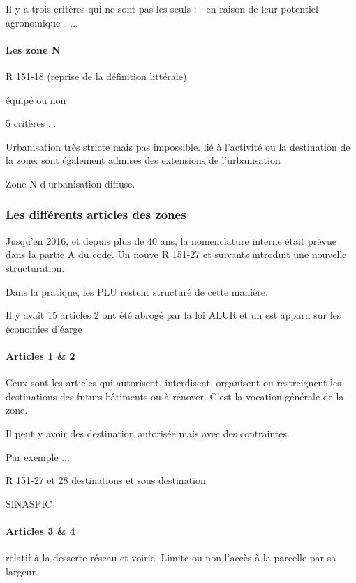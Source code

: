 			Il y a trois critères qui ne sont pas les seuls :
			- en raison de leur potentiel agronomique
			- ...
		
		\paragraph{Les zone N} R 151-18 (reprise de la définition littérale)
			
			équipé ou non
			
			5 critères ...
			
			Urbanisation très stricte mais pas impossible. lié à l'activité ou la destination de la zone. sont également admises des extensions de l'urbanisation
				
			Zone N d'urbanisation diffuse.
			
		\subsubsection{Les différents articles des zones}
		
			Jusqu'en 2016, et depuis plus de 40 ans, la nomenclature interne était prévue dans la partie A du code. Un nouve R 151-27 et suivants introduit une nouvelle structuration.
			
			Dans la pratique, les PLU restent structuré de cette manière.
			
			Il y avait 15 articles 2 ont été abrogé par la loi ALUR et un est apparu sur les économies d'éarge
			
			\paragraph{Articles 1 \& 2} Ceux sont les articles qui autorisent, interdisent, organisent ou restreignent les destinations des futurs bâtiments ou à rénover. C’est la vocation générale de la zone.
		
			Il peut y avoir des destination autorisée mais avec des contraintes.
			
			Par exemple ...
			
			R 151-27 et 28 destinations et sous destination 
			
			SINASPIC
			
			\paragraph{Articles 3 \& 4} relatif à la desserte réseau et voirie. Limite ou non l’accès à la parcelle par sa largeur.  
			
